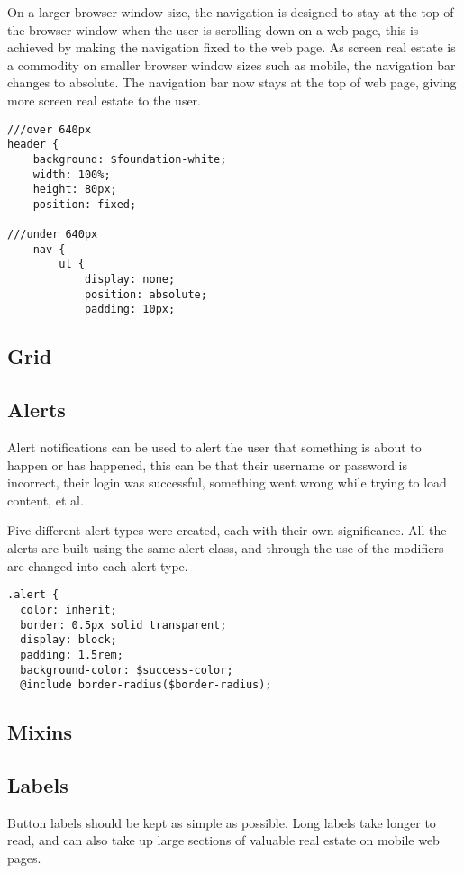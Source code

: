 On a larger browser window size, the navigation is designed to stay at the top of the browser window when the user is scrolling down on a web page, this is achieved by making the navigation fixed to the web page. As screen real estate is a commodity on smaller browser window sizes such as mobile, the navigation bar changes to absolute. The navigation bar now stays at the top of web page, giving more screen real estate to the user. 

\begin{lstlisting}[language=CSS3]
///over 640px
header {
	background: $foundation-white;
	width: 100%;
	height: 80px;
	position: fixed; 
	
///under 640px			
	nav {
		ul {
			display: none;
			position: absolute;
			padding: 10px;
\end{lstlisting}

\subsection{Grid}
\subsection{Alerts}
Alert notifications can be used to alert the user that something is about to happen or has happened, this can be that their username or password is incorrect, their login was successful, something went wrong while trying to load content, et al.

Five different alert types were created, each with their own significance. All the alerts are built using the same alert class, and through the use of the modifiers are changed into each alert type. 

\begin{lstlisting}[language=CSS3]
.alert {
  color: inherit;
  border: 0.5px solid transparent;
  display: block;
  padding: 1.5rem;
  background-color: $success-color;
  @include border-radius($border-radius);
\end{lstlisting}

\subsection{Mixins}
\subsection{Labels}

Button labels should be kept as simple as possible. Long labels take longer to read, and can also take up large sections of valuable real estate on mobile web pages. 

